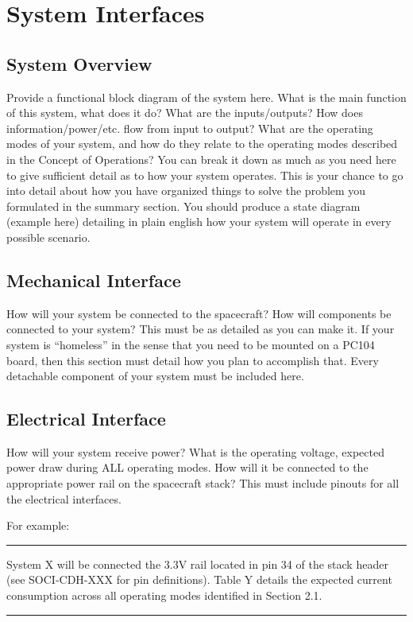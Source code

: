 \documentclass[12pt]{article}
\begin{document}
\section{System Interfaces}\label{sec:interfaces}

\subsection{System Overview}\label{sec2:sys_overview} 

Provide a functional block diagram of the system here. What is the main function of this system, what does it do? What are the inputs/outputs? How does information/power/etc. flow from input to output? What are the operating modes of your system, and how do they relate to the operating modes described in the Concept of Operations? You can break it down as much as you need here to give sufficient detail as to how your system operates. This is your chance to go into detail about how you have organized things to solve the problem you formulated in the summary section.  You should produce a state diagram (example here) detailing in plain english how your system will operate in every possible scenario.

\subsection{Mechanical Interface}\label{sec2:mech_interface}

How will your system be connected to the spacecraft? How will components be connected to your system? This must be as detailed as you can make it. If your system is “homeless” in the sense that you need to be mounted on a PC104 board, then this section must detail how you plan to accomplish that. Every detachable component of your system must be included here.

\subsection{Electrical Interface}\label{sec2:elec_interface}
How will your system receive power? What is the operating voltage, expected power draw during ALL operating modes. How will it be connected to the appropriate power rail on the spacecraft stack? This must include pinouts for all the electrical interfaces.\newline

For example:

\vspace{3pt}\hrule\vspace{3pt}
System X will be connected the 3.3V rail located in pin 34 of the stack header (see SOCI-CDH-XXX for pin definitions). Table Y details the expected current consumption across all operating modes identified in Section 2.1. 
\vspace{3pt}\hrule\vspace{3pt}
\end{document}
